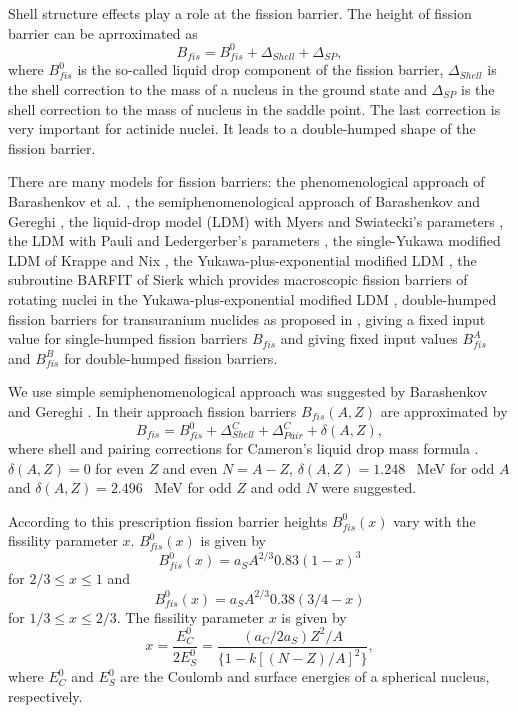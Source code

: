  Shell structure effects play a role at the fission
barrier. The height of fission barrier can be aprroximated as
\begin{equation}
\label{FP3}B_{fis} = B^{0}_{fis} + \Delta_{Shell} + \Delta_{SP},
\end{equation}
where $B^{0}_{fis}$ is the so-called liquid drop component of the
fission barrier, $\Delta_{Shell}$ is the shell correction to the mass of a
nucleus in the ground state and $\Delta_{SP}$ is the shell correction to
the mass of nucleus in the saddle point.  The last correction is very
important for actinide nuclei. It leads to a double-humped shape of the
fission barrier.
 
There are many models for fission barriers: the phenomenological approach 
of Barashenkov et al. \cite{Barash73}, the semiphenomenological 
approach of Barashenkov and Gereghi \cite{Barash77}, the liquid-drop model (LDM) 
with Myers and Swiatecki's parameters \cite{MS67}, the LDM with Pauli and Ledergerber's 
 parameters \cite{PG71}, the single-Yukawa modified LDM of Krappe and Nix 
 \cite{KN73}, the Yukawa-plus-exponential modified LDM \cite{KNS79}, the subroutine 
 BARFIT of Sierk \cite{Sierk86} which provides macroscopic fission barriers of 
 rotating nuclei in the Yukawa-plus-exponential modified LDM \cite{KNS79}, 
 double-humped fission barriers for transuranium nuclides as proposed in 
 \cite{KIF80}, giving a fixed 
 input value for single-humped fission barriers $B_{fis}$ 
 and giving fixed input values $B^A_{fis}$ and $B^B_{fis}$ for 
 double-humped fission barriers.
  
We use simple semiphenomenological 
approach was suggested by Barashenkov and Gereghi \cite{Barash77}. In their 
approach fission barriers $B_{fis}(A,Z)$ are approximated by 
\begin{equation}
\label{FP4} B_{fis} = B^{0}_{fis} + \Delta^{C}_{Shell}  + \Delta^{C}_{Pair} + 
\delta(A,Z),
\end{equation}
where shell and pairing corrections  for Cameron's
liquid drop mass formula \cite{CAM57}. $\delta(A,Z) = 0$ for even $Z$ 
and even $N = A - Z$, $\delta(A,Z) = 1.248$ \ MeV for odd $A$ and 
$\delta(A,Z) = 2.496$ \ MeV for odd $Z$ and odd $N$ were suggested.

According to this prescription fission barrier heights $B^{0}_{fis}(x)$
vary with the fissility parameter $x$. $B^{0}_{fis}(x)$ is
given by
\begin{equation}
\label{FP5} B^{0}_{fis}(x) = a_{S}A^{2/3} 0.83(1 - x)^3
\end{equation}
for $2/3 \leq x \leq 1$ and
\begin{equation}
\label{FP6} B^{0}_{fis}(x) =a_{S}A^{2/3} 0.38(3/4 -x)
\end{equation}
for $1/3 \leq x \leq 2/3$. 
The fissility parameter $x$ is given by
\begin{equation}
\label{FP7} x = \frac{E^0_C}{2E^0_S}= \frac{(a_C/2a_S)Z^2/A}
{\{1 - k[(N-Z)/A]^2\}},
\end{equation}
where $E^{0}_C$ and $E^{0}_S$ are the Coulomb and surface energies of 
a spherical nucleus, respectively.

